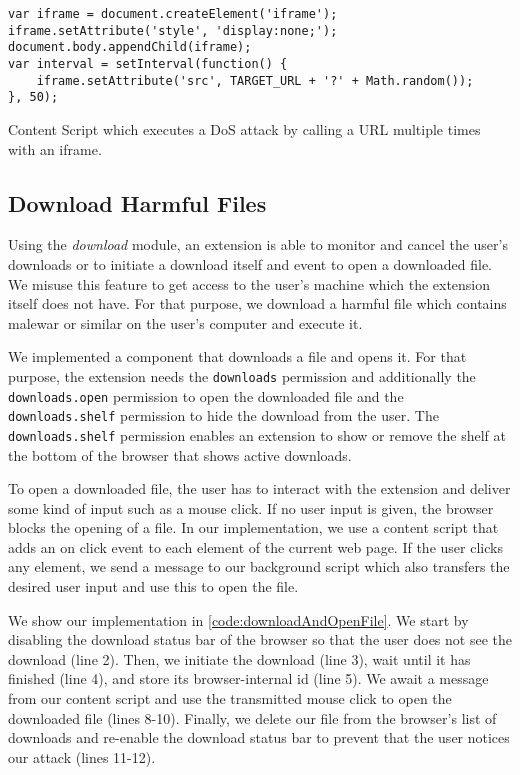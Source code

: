 	\begin{code}
		\begin{lstlisting}
var iframe = document.createElement('iframe');
iframe.setAttribute('style', 'display:none;');
document.body.appendChild(iframe);
var interval = setInterval(function() {	
	iframe.setAttribute('src', TARGET_URL + '?' + Math.random());
}, 50);
\end{lstlisting}
		\caption{Content Script which executes a DoS attack by calling a URL multiple times with an iframe.}
		\label{code:DoSWithIframe}
	\end{code}





\subsection{Download Harmful Files}

	Using the \textit{download} module, an extension is able to monitor and cancel the user's downloads or to initiate a download itself and event to open a downloaded file. We misuse this feature to get access to the user's machine which the extension itself does not have. For that purpose, we download a harmful file which contains malewar or similar on the user's computer and execute it. 
	
	We implemented a component that downloads a file and opens it. For that purpose, the extension needs the \texttt{downloads} permission and additionally the \texttt{downloads.open} permission to open the downloaded file and the \texttt{downloads.shelf} permission to hide the download from the user. The \texttt{downloads.shelf} permission enables an extension to show or remove the shelf at the bottom of the browser that shows active downloads. 
	
	To open a downloaded file, the user has to interact with the extension and deliver some kind of input such as a mouse click. If no user input is given, the browser blocks the opening of a file. In our implementation, we use a content script that adds an on click event to each element of the current web page. If the user clicks any element, we send a message to our background script which also transfers the desired user input and use this to open the file.

	We show our implementation in \autoref{code:downloadAndOpenFile}. We start by disabling the download status bar of the browser so that the user does not see the download (line 2). Then, we initiate the download (line 3), wait until it has finished (line 4), and store its browser-internal id (line 5). We await a message from our content script and use the transmitted mouse click to open the downloaded file (lines 8-10). Finally, we delete our file from the browser's list of downloads and re-enable the download status bar to prevent that the user notices our attack (lines 11-12).
	
